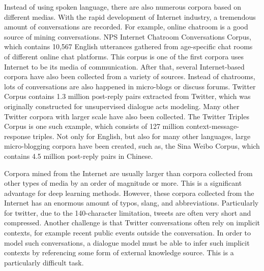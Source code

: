 \documentclass[bsc,frontabs,twoside,singlespacing,parskip,deptreport]{infthesis}     %
\begin{document}
Instead of using spoken language, there are also numerous corpora based on different medias. With the rapid development of Internet industry, a tremendous amount of conversations are recorded. For example, online chatroom is a good source of mining conversations. NPS Internet Chatroom Conversations Corpus\cite{forsythand2007lexical}, which contains 10,567 English utterances gathered from age-specific chat rooms of different online chat platforms. This corpus is one of the first corpora uses Internet to be its media of communication. After that, several Internet-based corpora have also been collected from a variety of sources. Instead of chatrooms, lots of conversations are also happened in micro-blogs or discuss forums. Twitter Corpus\cite{ritter2010unsupervised} contains 1.3 million post-reply pairs extracted from Twitter, which was originally constructed for unsupervised dialogue acts modeling. Many other Twitter corpora with larger scale have also been collected. The Twitter Triples Corpus\cite{sordoni2015neural} is one such example, which consists of 127 million context-message-response triples. Not only for English, but also for many other languages, large micro-blogging corpora have been created, such as, the Sina Weibo Corpus\cite{shang2015neural}, which contains 4.5 million post-reply pairs in Chinese.

Corpora mined from the Internet are usually larger than corpora collected from other types of media by an order of magnitude or more. This is a significant advantage for deep learning methods. However, these corpora collected from the Internet has an enormous amount of typos, slang, and abbreviations. Particularly for twitter, due to the 140-character limitation, tweets are often very short and compressed\cite{serban2018survey}. Another challenge is that Twitter conversations often rely on implicit contexts, for example recent public events outside the conversation. In order to model such conversations, a dialogue model must be able to infer such implicit contexts by referencing some form of external knowledge source. This is a particularly difficult task.
\end{document}
